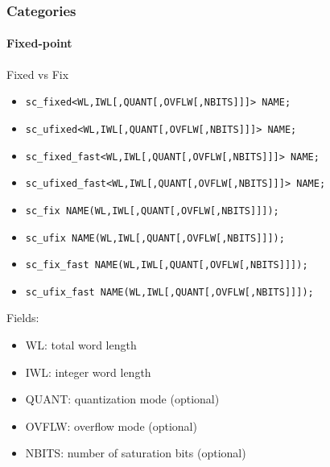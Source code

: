 \begin{frame}
\frametitle{Categories}
\framesubtitle{Fixed-point}
{\scriptsize
\begin{block}{Fixed vs Fix}
\vspace{-1em}
\begin{itemize}
\item \texttt{sc\_fixed<WL,IWL[,QUANT[,OVFLW[,NBITS]]]> NAME;}
\item \texttt{sc\_ufixed<WL,IWL[,QUANT[,OVFLW[,NBITS]]]> NAME;}
\item \texttt{sc\_fixed\_fast<WL,IWL[,QUANT[,OVFLW[,NBITS]]]> NAME;}
\item \texttt{sc\_ufixed\_fast<WL,IWL[,QUANT[,OVFLW[,NBITS]]]> NAME;}
\end{itemize}
\begin{itemize}
\item \texttt{sc\_fix NAME(WL,IWL[,QUANT[,OVFLW[,NBITS]]]);}
\item \texttt{sc\_ufix NAME(WL,IWL[,QUANT[,OVFLW[,NBITS]]]);}
\item \texttt{sc\_fix\_fast NAME(WL,IWL[,QUANT[,OVFLW[,NBITS]]]);}
\item \texttt{sc\_ufix\_fast NAME(WL,IWL[,QUANT[,OVFLW[,NBITS]]]);}
\end{itemize}
\end{block}
\pause
\begin{block}{Fields:} 
\vspace{-1em}
\begin{itemize}
\item WL: total word length
\item IWL: integer word length
\item QUANT: quantization mode (optional)
\item OVFLW: overflow mode (optional)
\item NBITS: number of saturation bits (optional)
\end{itemize}
\vspace{-1em}
\end{block}
}
\end{frame}

